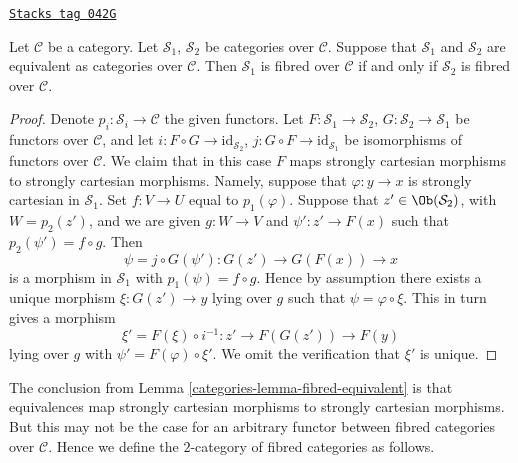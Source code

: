 \begin{lemma}
\label{categories-lemma-fibred-equivalent}
\href{https://stacks.math.columbia.edu/tag/042G}{\texttt{Stacks tag 042G}}

Let $\mathcal{C}$ be a category.
Let $\mathcal{S}_1$, $\mathcal{S}_2$ be categories over $\mathcal{C}$.
Suppose that $\mathcal{S}_1$ and $\mathcal{S}_2$ are equivalent
as categories over $\mathcal{C}$.
Then $\mathcal{S}_1$ is fibred over $\mathcal{C}$ if and only if
$\mathcal{S}_2$ is fibred over $\mathcal{C}$.
\end{lemma}

\begin{proof}
Denote $p_i : \mathcal{S}_i \to \mathcal{C}$ the given functors.
Let $F : \mathcal{S}_1 \to \mathcal{S}_2$,
$G : \mathcal{S}_2 \to \mathcal{S}_1$ be functors over $\mathcal{C}$, and let
$i : F \circ G \to \text{id}_{\mathcal{S}_2}$,
$j : G \circ F \to \text{id}_{\mathcal{S}_1}$ be isomorphisms of
functors over $\mathcal{C}$.
We claim that in this case $F$ maps strongly cartesian morphisms
to strongly cartesian morphisms. Namely, suppose that
$\varphi : y \to x$ is strongly cartesian in $\mathcal{S}_1$.
Set $f : V \to U$ equal to $p_1(\varphi)$. Suppose that
$z' \in \Ob(\mathcal{S}_2)$, with $W = p_2(z')$, and we are given
$g : W \to V$ and $\psi' : z' \to F(x)$ such that
$p_2(\psi') = f \circ g$. Then
$$
\psi = j \circ G(\psi') : G(z') \to G(F(x)) \to x
$$
is a morphism in $\mathcal{S}_1$ with $p_1(\psi) = f \circ g$.
Hence by assumption there exists a unique morphism $\xi : G(z') \to y$
lying over $g$ such that $\psi = \varphi \circ \xi$. This in turn gives a
morphism
$$
\xi' = F(\xi) \circ i^{-1} : z' \to F(G(z')) \to F(y)
$$
lying over $g$ with $\psi' = F(\varphi) \circ \xi'$. We omit the verification
that $\xi'$ is unique.
\end{proof}

The conclusion from Lemma \ref{categories-lemma-fibred-equivalent} is that
equivalences map strongly cartesian morphisms to strongly cartesian
morphisms. But this may not be the case for an arbitrary functor between
fibred categories over $\mathcal{C}$. Hence we define the $2$-category
of fibred categories as follows.

